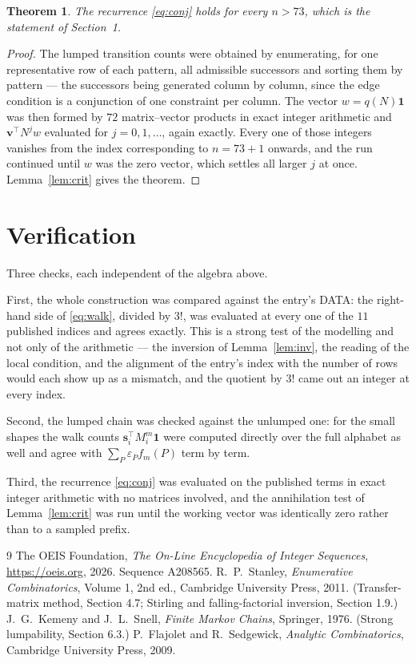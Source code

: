 \documentclass[11pt,a4paper]{article}
\theoremstyle{plain}
\newtheorem{theorem}{Theorem}
\theoremstyle{definition}
\begin{document}
\begin{theorem}
The recurrence \eqref{eq:conj} holds for every $n>73$, which is the statement of
Section~1.
\end{theorem}

\begin{proof}
The lumped transition counts were obtained by enumerating, for one representative row of
each pattern, all admissible successors and sorting them by pattern --- the successors being
generated column by column, since the edge condition is a conjunction of one constraint per
column. The vector $w=q(N)\mathbf{1}$ was then formed by $72$ matrix--vector products
in exact integer arithmetic and $\mathbf{v}^{\!\top}N^{j}w$ evaluated for
$j=0,1,\dots$, again exactly. Every one of those integers vanishes from the index
corresponding to $n=73+1$ onwards, and the run continued until $w$ was the zero vector,
which settles all larger $j$ at once. Lemma~\ref{lem:crit} gives the theorem.
\end{proof}

\section{Verification}

Three checks, each independent of the algebra above.

First, the whole construction was compared against the entry's DATA: the right-hand side of
\eqref{eq:walk}, divided by $3!$, was evaluated at every one of the $11$
published indices and agrees exactly. This is a strong test of the modelling and not only of
the arithmetic --- the inversion of Lemma~\ref{lem:inv}, the reading of the local
condition, and the alignment of the entry's index with the number of rows would each
show up as a mismatch, and the quotient by $3!$ came out an integer at every index.

Second, the lumped chain was checked against the unlumped one: for the small shapes the walk
counts $\mathbf{s}_i^{\!\top}M_i^{m}\mathbf{1}$ were computed directly over the full
alphabet as well and agree with $\sum_P\varepsilon_Pf_m(P)$ term by term.

Third, the recurrence \eqref{eq:conj} was evaluated on the published terms in exact integer
arithmetic with no matrices involved, and the annihilation test of Lemma~\ref{lem:crit} was
run until the working vector was identically zero rather than to a sampled prefix.

\begin{thebibliography}{9}
 The OEIS Foundation, \emph{The On-Line Encyclopedia of Integer
Sequences}, \url{https://oeis.org}, 2026. Sequence A208565.
 R.~P.~Stanley, \emph{Enumerative Combinatorics}, Volume 1, 2nd ed.,
Cambridge University Press, 2011. (Transfer-matrix method, Section 4.7; Stirling and
falling-factorial inversion, Section 1.9.)
 J.~G.~Kemeny and J.~L.~Snell, \emph{Finite Markov Chains}, Springer,
1976. (Strong lumpability, Section 6.3.)
 P.~Flajolet and R.~Sedgewick, \emph{Analytic Combinatorics}, Cambridge
University Press, 2009.
\end{thebibliography}
\end{document}
